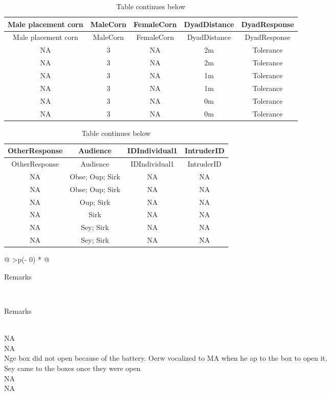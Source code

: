 \documentclass[
]{article}
\begin{document}
\begin{longtable}[]{@{}ccccc@{}}
\caption{Table continues below}\tabularnewline
\toprule
Male placement corn & MaleCorn & FemaleCorn & DyadDistance &
DyadResponse \\
\midrule
\endfirsthead
\toprule
Male placement corn & MaleCorn & FemaleCorn & DyadDistance &
DyadResponse \\
\midrule
\endhead
NA & 3 & NA & 2m & Tolerance \\
NA & 3 & NA & 2m & Tolerance \\
NA & 3 & NA & 1m & Tolerance \\
NA & 3 & NA & 1m & Tolerance \\
NA & 3 & NA & 0m & Tolerance \\
NA & 3 & NA & 0m & Tolerance \\
\bottomrule
\end{longtable}

\begin{longtable}[]{@{}cccc@{}}
\caption{Table continues below}\tabularnewline
\toprule
OtherResponse & Audience & IDIndividual1 & IntruderID \\
\midrule
\endfirsthead
\toprule
OtherResponse & Audience & IDIndividual1 & IntruderID \\
\midrule
\endhead
NA & Obse; Oup; Sirk & NA & NA \\
NA & Obse; Oup; Sirk & NA & NA \\
NA & Oup; Sirk & NA & NA \\
NA & Sirk & NA & NA \\
NA & Sey; Sirk & NA & NA \\
NA & Sey; Sirk & NA & NA \\
\bottomrule
\end{longtable}

\begin{longtable}[]{@{}
  >{\centering\arraybackslash}p{(\columnwidth - 0\tabcolsep) * }@{}}
\caption{Table continues below}\tabularnewline
\toprule
\begin{minipage}[b]{\linewidth}\centering
Remarks
\end{minipage} \\
\midrule
\endfirsthead
\toprule
\begin{minipage}[b]{\linewidth}\centering
Remarks
\end{minipage} \\
\midrule
\endhead
NA \\
NA \\
Nge box did not open because of the battery. Oerw vocalized to MA when
he ap to the box to open it. \\
Sey came to the boxes once they were open \\
NA \\
NA \\
\bottomrule
\end{longtable}
\end{document}
